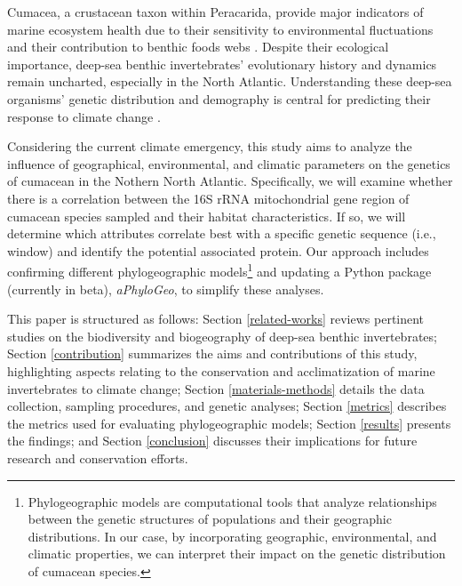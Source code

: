 Cumacea, a crustacean taxon within Peracarida, provide major indicators of marine ecosystem health due to their sensitivity to environmental fluctuations \citep{stransky_diversity_2010} and their contribution to benthic foods webs \citep{rehm2009cumacea}. Despite their ecological importance, deep-sea benthic invertebrates’ evolutionary history and dynamics remain uncharted, especially in the North Atlantic. Understanding these deep-sea organisms' genetic distribution and demography is central for predicting their response to climate change \citep{jennings_phylogeographic_2014}. 

Considering the current climate emergency, this study aims to analyze the influence of geographical, environmental, and climatic parameters on the genetics of cumacean in the Nothern North Atlantic. Specifically, we will examine whether there is a correlation between the 16S rRNA mitochondrial gene region of cumacean species sampled and their habitat characteristics. If so, we will determine which attributes correlate best with a specific genetic sequence (i.e., window) and identify the potential associated protein. Our approach includes confirming different {phylogeographic models}\footnote{Phylogeographic models are computational tools that analyze relationships between the genetic structures of populations and their geographic distributions. In our case, by incorporating geographic, environmental, and climatic properties, we can interpret their impact on the genetic distribution of cumacean species.} and updating a Python package (currently in beta), \textit{aPhyloGeo}, to simplify these analyses.

This paper is structured as follows: Section \autoref{related-works} reviews pertinent studies on the biodiversity and biogeography of deep-sea benthic invertebrates; Section \autoref{contribution} summarizes the aims and contributions of this study, highlighting aspects relating to the conservation and acclimatization of marine invertebrates to climate change; Section \autoref{materials-methods} details the data collection, sampling procedures, and genetic analyses; Section \autoref{metrics} describes the metrics used for evaluating phylogeographic models; Section \autoref{results} presents the findings; and Section \autoref{conclusion}  discusses their implications for future research and conservation efforts.


